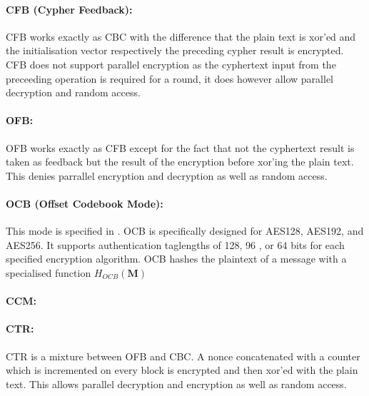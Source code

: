 \paragraph{CFB (Cypher Feedback):} CFB works exactly as CBC with the difference that the plain text is xor'ed and the initialisation vector respectively the preceding cypher result is encrypted. CFB does not support parallel encryption as the cyphertext input from the preceeding operation is required for a round, it does however allow parallel decryption and random access.

\paragraph{OFB:} OFB works exactly as CFB except for the fact that not the cyphertext result is taken as feedback but the result of the encryption before xor'ing the plain text. This denies parrallel encryption and decryption as well as random access.

\paragraph{OCB (Offset Codebook Mode):} This mode is specified in \cite{krovetz-ocb-04}. OCB is specifically designed for AES128, AES192, and AES256. It supports authentication taglengths of 128, 96 , or 64 bits for each specified encryption algorithm. OCB hashes the plaintext of a message with a specialised function $H_{OCB}(\mathbf{M})$



\paragraph{CCM:}


\paragraph{CTR:} CTR is a mixture between OFB and CBC. A nonce concatenated with a counter which is incremented on every block is encrypted and then xor'ed with the plain text. This allows parallel decryption and encryption as well as random access.

